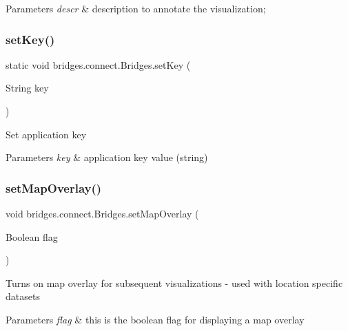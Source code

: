 \begin{DoxyParams}{Parameters}
{\em descr} & description to annotate the visualization; \\
\hline
\end{DoxyParams}
\mbox{\label{classbridges_1_1connect_1_1_bridges_ab69e89ec7d2e674a8b8c4b0be0c63397}} 
\subsubsection{\texorpdfstring{set\+Key()}{setKey()}}
{\footnotesize\ttfamily static void bridges.\+connect.\+Bridges.\+set\+Key (\begin{DoxyParamCaption}\item[{String}]{key }\end{DoxyParamCaption})\hspace{0.3cm}{\ttfamily [static]}}

Set application key


\begin{DoxyParams}{Parameters}
{\em key} & application key value (string) \\
\hline
\end{DoxyParams}
\mbox{\label{classbridges_1_1connect_1_1_bridges_a4af383ba2f114ad7bd4e08eb44096973}} 
\subsubsection{\texorpdfstring{set\+Map\+Overlay()}{setMapOverlay()}}
{\footnotesize\ttfamily void bridges.\+connect.\+Bridges.\+set\+Map\+Overlay (\begin{DoxyParamCaption}\item[{Boolean}]{flag }\end{DoxyParamCaption})}

Turns on map overlay for subsequent visualizations -\/ used with location specific datasets


\begin{DoxyParams}{Parameters}
{\em flag} & this is the boolean flag for displaying a map overlay \\
\hline
\end{DoxyParams}
\mbox{\label{classbridges_1_1connect_1_1_bridges_ab43e412448e1dfc340e58c407519a576}} 
